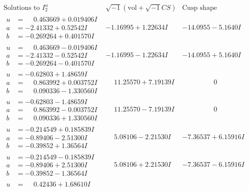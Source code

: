 \documentclass[1p]{elsarticle_modified}
\theoremstyle{definition}
\newcommand{\I}{\sqrt{-1}}
\begin{document}
$$\begin{array}{c|c|c}
\text{Solutions to }I^u_{2}& \I (\text{vol} + \sqrt{-1}CS) & \text{Cusp shape}\\
 \hline 
\begin{aligned}
u &= \phantom{-}0.463669 + 0.019406 I \\
a &= -2.41332 + 0.52542 I \\
b &= -0.269264 + 0.401570 I\end{aligned}
 & -1.16995 + 1.22634 I & -14.0955 - 5.1640 I \\ \hline\begin{aligned}
u &= \phantom{-}0.463669 - 0.019406 I \\
a &= -2.41332 - 0.52542 I \\
b &= -0.269264 - 0.401570 I\end{aligned}
 & -1.16995 - 1.22634 I & -14.0955 + 5.1640 I \\ \hline\begin{aligned}
u &= -0.62803 + 1.48659 I \\
a &= \phantom{-}0.863992 + 0.003752 I \\
b &= \phantom{-}0.090336 - 1.330560 I\end{aligned}
 & \phantom{-}11.25570 + 7.19139 I & \phantom{-0.000000 } 0 \\ \hline\begin{aligned}
u &= -0.62803 - 1.48659 I \\
a &= \phantom{-}0.863992 - 0.003752 I \\
b &= \phantom{-}0.090336 + 1.330560 I\end{aligned}
 & \phantom{-}11.25570 - 7.19139 I & \phantom{-0.000000 } 0 \\ \hline\begin{aligned}
u &= -0.214549 + 0.185839 I \\
a &= -0.89406 - 2.51300 I \\
b &= -0.39852 + 1.36564 I\end{aligned}
 & \phantom{-}5.08106 - 2.21530 I & -7.36537 + 6.15916 I \\ \hline\begin{aligned}
u &= -0.214549 - 0.185839 I \\
a &= -0.89406 + 2.51300 I \\
b &= -0.39852 - 1.36564 I\end{aligned}
 & \phantom{-}5.08106 + 2.21530 I & -7.36537 - 6.15916 I \\ \hline\begin{aligned}
u &= \phantom{-}0.42436 + 1.68610 I \\

\end{aligned}
\end{array}$$
\end{document}
